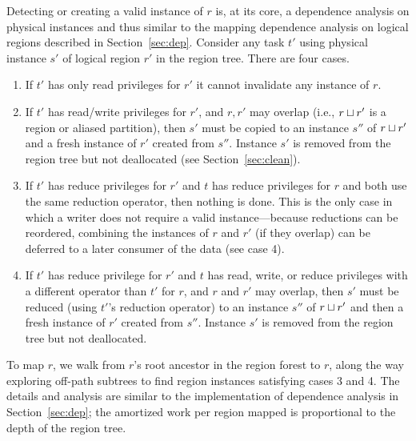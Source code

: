 Detecting or creating a valid instance of $r$ is, at its core, a dependence analysis on
physical instances and thus similar to the mapping dependence analysis on logical
regions described in Section~\ref{sec:dep}.  Consider any task $t'$ using
physical instance $s'$ of logical region $r'$ in the region tree.  There are four cases.
\begin{enumerate}
\item If $t'$ has only read privileges
for $r'$ it cannot invalidate any instance of $r$.

\item If $t'$ has read/write privileges for $r'$, and $r, r'$ may
  overlap (i.e., $r \sqcup r'$ is a region or aliased
  partition), then $s'$ must be copied to an instance $s''$ of
  $r \sqcup r'$ and a fresh instance of $r'$ created from $s''$.
Instance $s'$ is removed from the region tree
  but not deallocated (see Section~\ref{sec:clean}).

\item If $t'$ has reduce privileges for $r'$ and $t$ has reduce
  privileges for $r$ and both use the same reduction operator, then
  nothing is done.  This is the only case in which a writer
  does not require a valid instance---because reductions can be
  reordered, combining the instances of $r$ and $r'$ (if they
  overlap) can be deferred to a later consumer of the data (see case
  4).

\item If $t'$ has reduce privilege for $r'$ and $t$ has read, write, 
  or reduce privileges with a different operator than $t'$
  for $r$, and $r$ and $r'$ may overlap, then $s'$ must be
  reduced (using $t'$'s reduction operator) to an instance $s''$ of
  $r \sqcup r'$ and then a fresh instance of $r'$ created from $s''$.
Instance $s'$ is removed from the region
  tree but not deallocated.
\end{enumerate}

To map $r$, we walk from $r$'s
root ancestor in the region forest to $r$, along the way exploring
off-path subtrees to find region instances satisfying cases 3 and
4. The details and analysis are similar to the implementation of dependence
analysis in Section~\ref{sec:dep}; the amortized work per region mapped
is proportional to the depth of the region tree.

